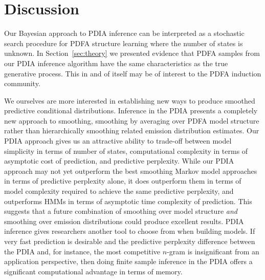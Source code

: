 \section{Discussion}
\label{sec:discussion}

Our Bayesian approach to PDIA inference can be interpreted as a stochastic search procedure for PDFA structure learning where the number of states is unknown.  In Section~\ref{sec:theory} we presented evidence that PDFA samples from our PDIA inference algorithm have the same characteristics as the true generative process.  This in and of itself may be of interest to the PDFA induction community.  

We ourselves are more interested in establishing new ways to produce smoothed predictive conditional distributions.  Inference in the PDIA presents a completely new approach to smoothing, smoothing by averaging over PDFA model structure rather than hierarchically smoothing related emission distribution estimates.   Our PDIA approach gives us an attractive ability to trade-off between model simplicity in terms of number of states, computational complexity in terms of asymptotic cost of prediction, and predictive perplexity.  While our PDIA approach may not yet outperform the best smoothing Markov model approaches in terms of predictive perplexity alone, it does outperform them in terms of model complexity required to achieve the same predictive perplexity, and outperforms HMMs in terms of asymptotic time complexity of prediction.  This suggests that a future combination of smoothing over model structure {\em and} smoothing over emission distributions could produce excellent results.  PDIA inference gives researchers another tool to choose from when building models.  If very fast prediction is desirable and the predictive perplexity difference between the PDIA and, for instance, the most competitive $n$-gram is insignificant from an application perspective, then doing finite sample inference in the PDIA offers a significant computational advantage in terms of memory.

